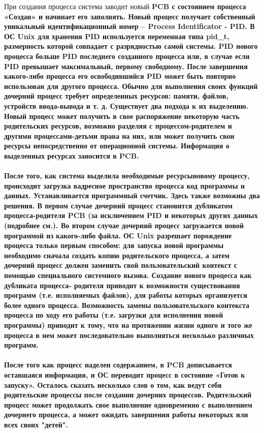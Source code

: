 \documentclass[a4paper]{article}
\begin{document}
При создания процесса система заводит новый \bf PCB \rm с состоянием процесса «Создан» и начинает его заполнять. Новый процесс получает собственный уникальный идентификационный номер – Process Identificator - PID. В ОС Unix для хранения PID используется переменная типа pid\_t, размерность которой совпадает с разрядностью самой системы. PID нового процесса больше PID последнего созданного процесса или, в случае если PID превышает максимальный, первому свободному. После завершения какого-либо процесса его освободившийся PID может быть повторно использован для другого процесса. Обычно для выполнения своих функций дочерний процесс требует определенных ресурсов: памяти, файлов, устройств ввода-вывода и т. д. Существует два подхода к их выделению. Новый процесс может получить в свое распоряжение некоторую часть родительских ресурсов, возможно разделяя с процессом-родителем и другими процессами-детьми права на них, или может получить свои ресурсы непосредственно от операционной системы. Информация о выделенных ресурсах заносится в \bf PCB.\\\\
\rm После того, как система выделила необходимые ресурсыновому процессу, происходит загрузка вадресное пространство процесса код программы и данных. Устанавливается программный счетчик. Здесь также возможны два решения. В первом случае дочерний процесс становится дубликатом процесса-родителя \bf PCB \rm(за исключением PID и некоторых других данных (подробнее см.). Во втором случае дочерний процесс загружается новой программой из какого-либо файла. ОС Unix разрешает порождение процесса только первым способом: для запуска новой программы необходимо сначала создать копию родительского процесса, а затем дочерний процесс должен заменить свой пользовательский контекст с помощью специального системного вызова. Создание нового процесса как дубликата процесса- родителя приводит к возможности существования программ (т.е. исполняемых файлов), для работы которых организуется более одного процесса.
Возможность замены пользовательского контекста процесса по ходу его работы (т.е. загрузки для исполнения новой программы) приводит к
тому, что на протяжении жизни одного и того же процесса в нем может последовательно выполняться несколько различных программ.\\\\
После того как процесс наделен содержанием, в \bf PCB \rm дописывается оставшаяся информация, и ОС переводит процесс в состояние «Готов к запуску». Осталось сказать несколько слов о том, как ведут себя родительские процессы после создании дочерних процессов. Родительский процесс может продолжать свое выполнение одновременно с выполнением дочернего процесса, а может ожидать завершения работы некоторых или всех своих "детей". \\
\end{document}
